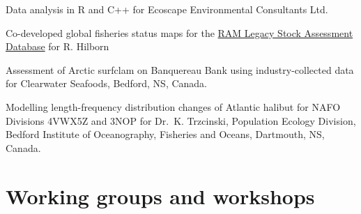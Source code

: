 \begin{description}
\tightlist
\item[2014--15]
Data analysis in R and C++ for Ecoscape Environmental Consultants Ltd.
\item[2013]
Co-developed global fisheries status maps for the
\href{http://ramlegacy.org/}{RAM Legacy Stock Assessment Database} for
R. Hilborn
\item[2010]
Assessment of Arctic surfclam on Banquereau Bank using
industry-collected data for Clearwater Seafoods, Bedford, NS, Canada.
\item[2010]
Modelling length-frequency distribution changes of Atlantic halibut for
NAFO Divisions 4VWX5Z and 3NOP for Dr.\ K. Trzcinski, Population Ecology
Division, Bedford Institute of Oceanography, Fisheries and Oceans,
Dartmouth, NS, Canada.
\end{description}

\hypertarget{working-groups-and-workshops}{%
\section{Working groups and
workshops}\label{working-groups-and-workshops}}

